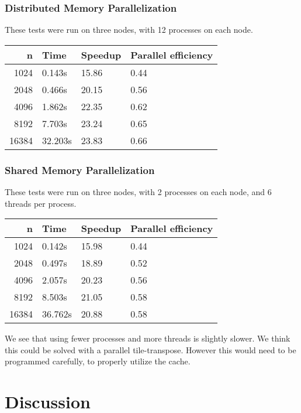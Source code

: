 \documentclass[a4paper, 12pt]{article}
\begin{document}
        \subsubsection{Distributed Memory Parallelization}
        These tests were run on three nodes, with 12 processes on each node.

        \begin{tabular}{|r|l|l|l|}
        \hline
        n & Time & Speedup & Parallel efficiency\\
        \hline
        1024 & 0.143s & 15.86 & 0.44 \\
        \hline
        2048 & 0.466s & 20.15 & 0.56 \\
        \hline
        4096 & 1.862s & 22.35 & 0.62\\
        \hline
        8192 & 7.703s & 23.24 & 0.65\\
        \hline
        16384 & 32.203s & 23.83 & 0.66 \\
        \hline
        \end{tabular}
         
        \subsubsection{Shared Memory Parallelization}
        These tests were run on three nodes, with 2 processes on each node, and 6 threads per process.

        \begin{tabular}{|r|l|l|l|}
        \hline
        n & Time & Speedup & Parallel efficiency \\
        \hline
        1024 & 0.142s & 15.98 & 0.44 \\
        \hline
        2048 & 0.497s & 18.89 & 0.52 \\
        \hline
        4096 & 2.057s & 20.23 & 0.56 \\
        \hline
        8192 & 8.503s & 21.05 & 0.58\\
        \hline
        16384 & 36.762s & 20.88 & 0.58\\
        \hline
        \end{tabular}
        
        We see that using fewer processes and more threads is slightly slower. We think this could be solved with a parallel tile-transpose. However this would need to be programmed carefully, to properly utilize the cache.

\section{Discussion}
\end{document}
